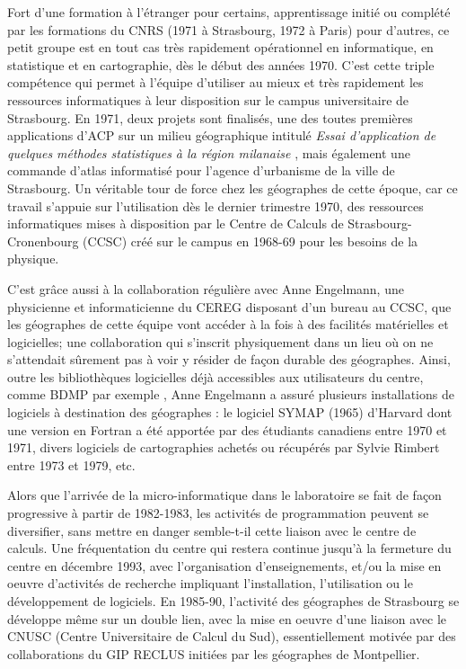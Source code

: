 Fort d'une formation à l'étranger pour certains, apprentissage initié ou complété par les formations du CNRS (1971 à Strasbourg, 1972 à Paris) pour d'autres, ce petit groupe est en tout cas très rapidement opérationnel en informatique, en statistique et en cartographie, dès le début des années 1970. C'est cette triple compétence qui permet à l'équipe d'utiliser au mieux et très rapidement les ressources informatiques à leur disposition sur le campus universitaire de Strasbourg. En 1971, deux projets sont finalisés, une des toutes premières applications d’ACP sur un milieu géographique intitulé \textit{Essai d’application de quelques méthodes statistiques à la région milanaise} \autocite{Dalmasso1971}, mais également une commande d'atlas informatisé pour l'agence d'urbanisme de la ville de Strasbourg. Un véritable tour de force chez les géographes de cette époque, car ce travail s'appuie sur l'utilisation dès le dernier trimestre 1970, des ressources informatiques mises à disposition par le Centre de Calculs de Strasbourg-Cronenbourg (CCSC) créé sur le campus en 1968-69 pour les besoins de la physique.

C'est grâce aussi à la collaboration régulière avec Anne Engelmann, une physicienne et informaticienne du CEREG disposant d'un bureau au CCSC, que les géographes de cette équipe vont accéder à la fois à des facilités matérielles  et logicielles; une collaboration qui s'inscrit physiquement dans un lieu où on ne s'attendait sûrement pas à voir y résider de façon durable des géographes. Ainsi, outre les bibliothèques logicielles déjà accessibles aux utilisateurs du centre, comme BDMP par exemple , Anne Engelmann a assuré plusieurs installations de logiciels à destination des géographes : le logiciel SYMAP (1965) d'Harvard dont une version en Fortran a été apportée par des étudiants canadiens entre 1970 et 1971, divers logiciels de cartographies achetés ou récupérés par Sylvie Rimbert entre 1973 et 1979, etc.

Alors que l'arrivée de la micro-informatique dans le laboratoire se fait de façon progressive à partir de 1982-1983, les activités de programmation peuvent se diversifier, sans mettre en danger semble-t-il cette liaison avec le centre de calculs. Une fréquentation du centre qui restera continue jusqu'à la fermeture du centre en décembre 1993, avec l'organisation d'enseignements, et/ou la mise en oeuvre d'activités de recherche impliquant l'installation, l'utilisation ou le développement de logiciels. En 1985-90, l'activité des géographes de Strasbourg se développe même sur un double lien, avec la mise en oeuvre d'une liaison avec le CNUSC (Centre Universitaire de Calcul du Sud), essentiellement motivée par des collaborations du GIP RECLUS initiées par les géographes de Montpellier.


